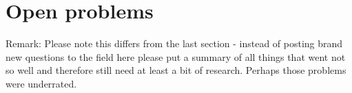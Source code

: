 \section{Open problems}
Remark: Please note this differs from the last section - instead of posting brand new questions to the field here please put a summary of all things that went not so well and therefore still need at least a bit of research. Perhaps those problems were underrated.
